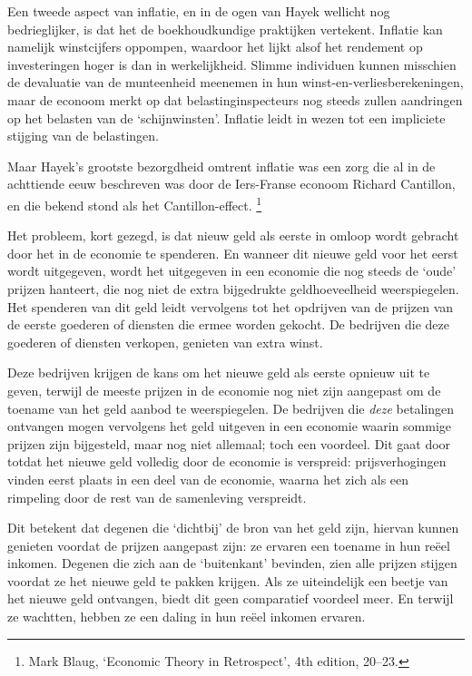 \documentclass[
  a5paper,
  smalldemyvopaper,11pt,twoside,onecolumn,openright,extrafontsizes]{memoir}
\begin{document}
Een tweede aspect van inflatie, en in de ogen van Hayek wellicht nog
bedrieglijker, is dat het de boekhoudkundige praktijken vertekent.
Inflatie kan namelijk winstcijfers oppompen, waardoor het lijkt alsof
het rendement op investeringen hoger is dan in werkelijkheid. Slimme
individuen kunnen misschien de devaluatie van de munteenheid meenemen in
hun winst-en-verliesberekeningen, maar de econoom merkt op dat
belastinginspecteurs nog steeds zullen aandringen op het belasten van de
`schijnwinsten'. Inflatie leidt in wezen tot een impliciete stijging van
de belastingen.

Maar Hayek's grootste bezorgdheid omtrent inflatie was een zorg die al
in de achttiende eeuw beschreven was door de Iers-Franse econoom Richard
Cantillon, en die bekend stond als het Cantillon-effect. \footnote{\hspace{0pt}Mark
  Blaug, `Economic Theory in Retrospect', 4th edition, 20--23.}

Het probleem, kort gezegd, is dat nieuw geld als eerste in omloop wordt
gebracht door het in de economie te spenderen. En wanneer dit nieuwe
geld voor het eerst wordt uitgegeven, wordt het uitgegeven in een
economie die nog steeds de `oude' prijzen hanteert, die nog niet de
extra bijgedrukte geldhoeveelheid weerspiegelen. Het spenderen van dit
geld leidt vervolgens tot het opdrijven van de prijzen van de eerste
goederen of diensten die ermee worden gekocht. De bedrijven die deze
goederen of diensten verkopen, genieten van extra winst.

Deze bedrijven krijgen de kans om het nieuwe geld als eerste opnieuw uit
te geven, terwijl de meeste prijzen in de economie nog niet zijn
aangepast om de toename van het geld aanbod te weerspiegelen. De
bedrijven die \emph{deze} betalingen ontvangen mogen vervolgens het geld
uitgeven in een economie waarin sommige prijzen zijn bijgesteld, maar
nog niet allemaal; toch een voordeel. Dit gaat door totdat het nieuwe
geld volledig door de economie is verspreid: prijsverhogingen vinden
eerst plaats in een deel van de economie, waarna het zich als een
rimpeling door de rest van de samenleving verspreidt.

Dit betekent dat degenen die `dichtbij' de bron van het geld zijn,
hiervan kunnen genieten voordat de prijzen aangepast zijn: ze ervaren
een toename in hun reëel inkomen. Degenen die zich aan de `buitenkant'
bevinden, zien alle prijzen stijgen voordat ze het nieuwe geld te pakken
krijgen. Als ze uiteindelijk een beetje van het nieuwe geld ontvangen,
biedt dit geen comparatief voordeel meer. En terwijl ze wachtten, hebben
ze een daling in hun reëel inkomen ervaren.
\end{document}
